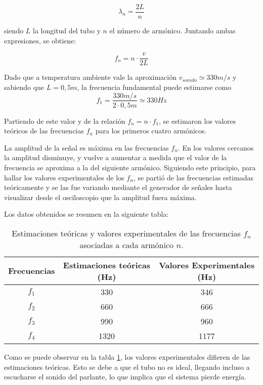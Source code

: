 \documentclass[12pt, a4paper]{article}
\begin{document}
\begin{equation}
  \lambda_{n} = \frac{2L}{n}
  \label{equation2}
\end{equation}

siendo $L$ la longitud del tubo y $n$ el número de armónico. Juntando ambas expresiones, se obtiene:

\begin{equation}
  f_{n} = n \cdot \frac{v}{2L}
  \label{equation3}
\end{equation}

Dado que a temperatura ambiente vale la aproximación $v_{sonido}\simeq 330 m/s$ y sabiendo que $L=0,5 m$, la frecuencia fundamental puede estimarse como 
$$f_{1} = \frac{330 m/s}{2 \cdot 0,5m} \simeq 330 Hz$$

Partiendo de este valor y de la relación $f_{n}=n\cdot f_{1}$, se estimaron los valores teóricos de las frecuencias $f_{n}$ para los primeros cuatro armónicos.

La amplitud de la señal es máxima en las frecuencias $f_{n}$. En los valores cercanos la amplitud disminuye, y vuelve a aumentar a medida que el valor de la frecuencia se aproxima a la del siguiente armónico. Siguiendo este principio, para hallar los valores experimentales de los $f_{n}$, se partió de las frecuencias estimadas teóricamente y se las fue variando mediante el generador de señales hasta visualizar desde el osciloscopio que la amplitud fuera máxima.

Los datos obtenidos se resumen en la siguiente tabla:

\begin{table}[H]
  \centering
  \begin{tabular}{|c|c|c|}
  \hline
  Frecuencias & Estimaciones teóricas (Hz) & Valores Experimentales (Hz)\\
  \hline
  $f_1$  & 330  & 346 \\ \hline
  $f_2$  & 660 & 666 \\ \hline
  $f_3$  & 990 & 960 \\ \hline
  $f_4$  & 1320  & 1177 \\ \hline
  \end{tabular}
  \caption{\centering Estimaciones teóricas y valores experimentales de las frecuencias $f_{n}$ asociadas a cada armónico $n$.}
  \label{tabla1}
\end{table}

Como se puede observar en la tabla \ref{tabla1}, los valores experimentales difieren de las estimaciones teóricas. Esto se debe a que el tubo no es ideal, llegando incluso a escucharse el sonido del parlante, lo que implica que el sistema pierde energía.
\end{document}
